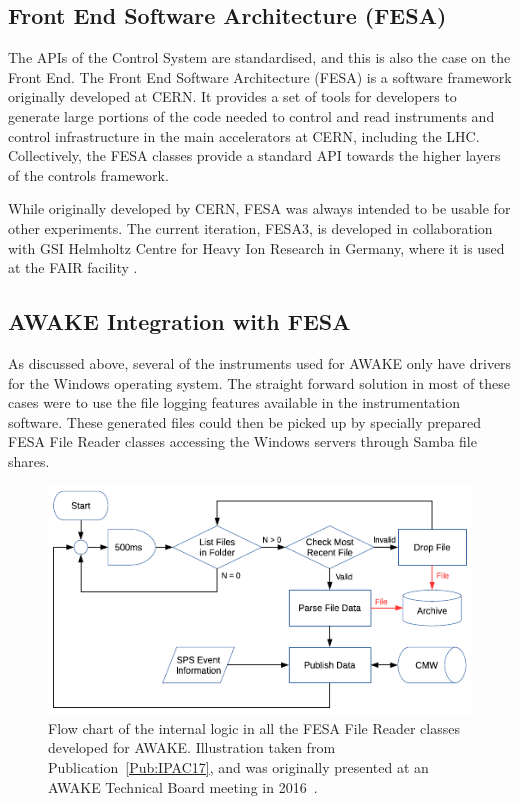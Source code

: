 \subsection{Front End Software Architecture (FESA)}
\label{DAQ:FESA}

The APIs of the Control System are standardised, and this is also the case on the Front End.
The Front End Software Architecture (FESA) is a software framework originally developed at CERN.
It provides a set of tools for developers to generate large portions of the code needed to control and read instruments and control infrastructure in the main accelerators at CERN, including the LHC.
Collectively, the FESA classes provide a standard API towards the higher layers of the controls framework.

While originally developed by CERN, FESA was always intended to be usable for other experiments.
The current iteration, FESA3, is developed in collaboration with GSI Helmholtz Centre for Heavy Ion Research in Germany, where it is used at the FAIR facility \cite{schwinn:2010}.

\subsection{AWAKE Integration with FESA}
\label{DAQ:Integration}

As discussed above, several of the instruments used for AWAKE only have drivers for the Windows operating system.
The straight forward solution in most of these cases were to use the file logging features available in the instrumentation software.
These generated files could then be picked up by specially prepared FESA File Reader classes accessing the Windows servers through Samba file shares.

\begin{figure}[hbt]
    \centering
    \includegraphics[width=0.85\linewidth,trim={0mm 0mm 0mm 0mm},clip]{figures/FileReader}
    \caption{\label{Fig:DAQ:Reader}
        Flow chart of the internal logic in all the FESA File Reader classes developed for AWAKE.
        Illustration taken from Publication~\ref{Pub:IPAC17}, and was originally presented at an AWAKE Technical Board meeting in 2016~\cite{add:berglyd_olsen:2016}.
    }
\end{figure}


